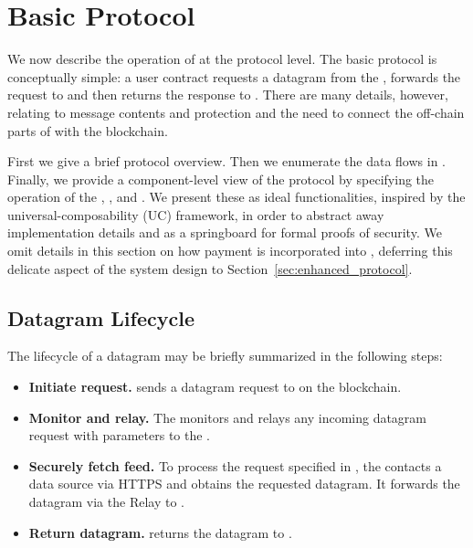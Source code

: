 

\section{Basic \tc Protocol}
\label{sec:protocols}
We now describe the operation of \tc at the protocol level. The basic protocol is conceptually simple: a user contract \reqcont requests a datagram from the \tcontract \tcont, \tcont forwards the request to \engine and then returns the response to \reqcont. There are many details, however, relating to message contents and protection and the need to connect the off-chain parts of \tc with the blockchain.

First we give a brief protocol overview. Then we enumerate the data flows in \tc. Finally, we provide a component-level view of the protocol by specifying the operation of the \tcontract, \medname, and \encname. We present these  as ideal functionalities, inspired by the universal-composability (UC) framework, in order to abstract away implementation details and as a springboard for formal proofs of security. We omit details in this section on how payment is incorporated into \tc, deferring this delicate aspect of the system design to Section~\ref{sec:enhanced_protocol}.

\subsection{Datagram Lifecycle}

The lifecycle of a datagram may be briefly summarized in the following steps:

\vspace{-2mm}
\begin{itemize}
  \setlength{\itemsep}{2pt}
  \setlength{\parskip}{0pt}
  \setlength{\parsep}{0pt}
\item {\bf Initiate request.} \reqcont sends a datagram request to \tcont on the blockchain.

\item {\bf Monitor and relay.} The \medname monitors \tcont and relays any incoming datagram request with parameters \dgform to the \encname.

\item {\bf Securely fetch feed.} To process the request specified in \dgform, the \encname contacts a data source via HTTPS and obtains the requested datagram. It forwards the datagram via the Relay to \tcont.

\item {\bf Return datagram.} \tcont returns the datagram to \reqcont.
\end{itemize}
\vspace{-2mm}

